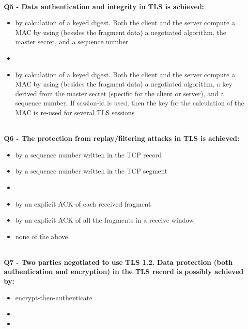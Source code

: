 \textbf{\\Q5 - Data authentication and integrity in TLS is achieved:}
\begin{itemize}
	\item[A.] by calculation of a keyed digest. Both the client and the server compute a MAC by using (besides the fragment data) a negotiated algorithm, the master secret, and a sequence number
	\item[B.] 
	\item[C.] by calculation of a keyed digest. Both the client and the server compute a MAC by using (besides the fragment data) a negotiated algorithm, a key derived from the master secret (specific for the client or server), and a sequence number. If session-id is used, then the key for the calculation of the MAC is re-used for several TLS sessions
\end{itemize}
\com{}

\textbf{\\Q6 - The protection from replay/filtering attacks in TLS is achieved:}
\begin{itemize}
	\item[A.] by a sequence number written in the TCP record
	\item[B.] by a sequence number written in the TCP segment
	\item[C.] 
	\item[D.] by an explicit ACK of each received fragment
	\item[E.] by an explicit ACK of all the fragments in a receive window
	\item[F.] none of the above
\end{itemize}
\com{}


\textbf{\\Q7 - Two parties negotiated to use TLS 1.2. Data protection (both authentication and encryption) in the TLS record is possibly achieved by:}
\begin{itemize}
	\item[A.] encrypt-then-authenticate
	\item[B.] 
	\item[C.] 
\end{itemize}

